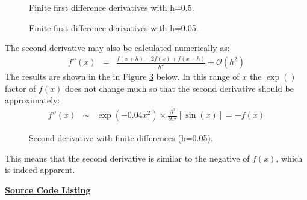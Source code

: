 \documentclass[11pt,letterpaper]{article}
\begin{document}
\begin{figure}[htb!]
\begin{center}
\leavevmode
{}
\end{center}
\caption{Finite first difference derivatives with h=0.5.
\label{fbigh}}
\end{figure}

         
\begin{figure}[htb!]
\begin{center}
\leavevmode
{}
\end{center}
\caption{Finite first difference derivatives with h=0.05.
\label{fsmallh}}
\end{figure}

The second derivative may also be calculated numerically as:
\begin{eqnarray}
f''(x) & = & \frac{ f(x+h) -2f(x) + f(x-h) }{h^2} + \mathcal{O}(h^2)
\end{eqnarray}
The results are shown in the in Figure \ref{ffpp} below. In this range of $x$ the
$\exp()$ factor of
$f(x)$  does not change much so that the second derivative should be approximately:
\begin{eqnarray}
f''(x) & \sim & \exp ( -0.04x^2 ) \times \frac{\partial^2}{\partial x^2}
    \left[ \sin(x) \right] = - f(x)
\end{eqnarray}
             
\begin{figure}[htb!]
\begin{center}
\leavevmode
{}
\end{center}
\caption{Second derivative with finite differences  (h=0.05).
\label{ffpp}}
\end{figure}

This means that the second derivative is similar to the negative of $f(x)$, which is
indeed apparent.

\newpage 

\begin{center}
\underline{\bf \large Source Code Listing}
\end{center}
\end{document}
